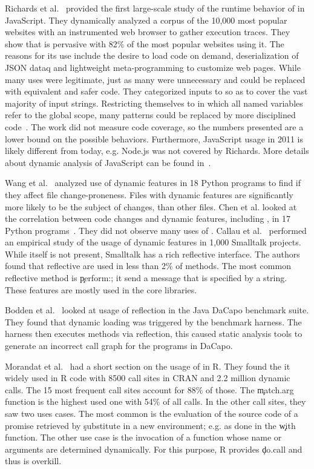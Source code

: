 \documentclass[screen,acmsmall]{acmart}
\begin{document}
Richards et al.~\cite{ecoop11} provided the first large-scale study of
the runtime behavior of \eval in JavaScript. They dynamically analyzed
a corpus of the 10,000 most popular websites with an instrumented web
browser to gather execution traces. They show that \eval is pervasive
with 82\% of the most popular websites using it. The reasons for its
use include the desire to load code on demand, deserialization of JSON
dataq and lightweight meta-programming to customize web pages. While
many uses were legitimate, just as many were unnecessary and could be
replaced with equivalent and safer code. They categorized inputs to
\eval so as to cover the vast majority of input strings. Restricting
themselves to \eval in which all named variables refer to the global
scope, many patterns could be replaced by more disciplined
code~\cite{oopsla12b, moller12}. The work did not measure code
coverage, so the numbers presented are a lower bound on the possible
behaviors. Furthermore, JavaScript usage in 2011 is likely different
from today, e.g. Node.js was not covered by Richards. More details
about dynamic analysis of JavaScript can be found in~\cite{liang}.

Wang et al.~\cite{wang} analyzed use of dynamic features in 18 Python
programs to find if they affect file change-proneness. Files with
dynamic features are significantly more likely to be the subject of
changes, than other files. Chen et al. looked at the correlation
between code changes and dynamic features, including \eval, in 17
Python programs~\cite{chen}. They did not observe many uses of \eval.
Callau et al.~\cite{oscar} performed an empirical study of the usage
of dynamic features in 1,000 Smalltalk projects. While \eval itself is
not present, Smalltalk has a rich reflective interface. The authors
found that reflective are used in less than 2\% of methods. The most
common reflective method is \c{perform:}; it send a message that is
specified by a string. These features are mostly used in the core
libraries.

Bodden et al.~\cite{bodden} looked at usage of reflection in the Java
DaCapo benchmark suite. They found that dynamic loading was triggered
by the benchmark harness. The harness then executes methods via
reflection, this caused static analysis tools to generate an incorrect
call graph for the programs in DaCapo.

Morandat et al.~\cite{ecoop12} had a short section on the usage of
\eval in R. They found the it widely used in R code with 8500 call
sites in CRAN and 2.2 million dynamic calls. The 15 most frequent call
sites account for 88\% of those. The \c{match.arg} function is the
highest used one with 54\% of all calls. In the other call sites, they
saw two uses cases. The most common is the evaluation of the source
code of a promise retrieved by \c{substitute} in a new environment;
e.g. as done in the \c{with} function. The other use case is the
invocation of a function whose name or arguments are determined
dynamically. For this purpose, R provides \c{do.call} and thus \eval
is overkill.
\end{document}
